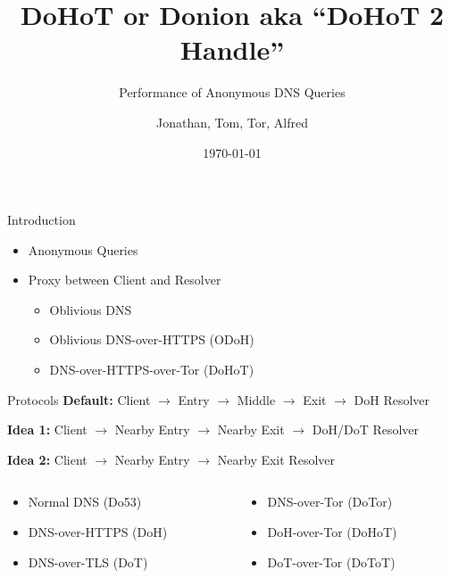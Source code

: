 \documentclass[xcolor=x11names,dvipsnames,aspectratio=169]{beamer}
\title{\huge DoHoT or Donion aka ``DoHoT 2 Handle''}
\subtitle{Performance of Anonymous DNS Queries}
\author{\small Jonathan, Tom, Tor, Alfred}
\date{\today}
\begin{document}
    \setcounter{showProgressBar}{0}
	\setcounter{showSlideNumbers}{0}

	\frame{\titlepage}

	\setcounter{framenumber}{0}
	\setcounter{showProgressBar}{1}
	\setcounter{showSlideNumbers}{1}

    \begin{frame}{Introduction}
        \begin{itemize}
            \item Anonymous Queries
            \item Proxy between Client and Resolver
            \begin{itemize}
                \item Oblivious DNS
                \item Oblivious DNS-over-HTTPS (ODoH)
                \item DNS-over-HTTPS-over-Tor (DoHoT)
            \end{itemize}
        \end{itemize}
    \end{frame}

    \begin{frame}{Protocols}
        \textbf{Default:}
        Client $\rightarrow$
        Entry $\rightarrow$
        Middle $\rightarrow$
        Exit $\rightarrow$
        DoH Resolver

        \vspace{1em}
        \textbf{Idea 1:}
        Client $\rightarrow$
        Nearby Entry $\rightarrow$
        Nearby Exit $\rightarrow$
        DoH/DoT Resolver

        \vspace{1em}
        \textbf{Idea 2:}
        Client $\rightarrow$
        Nearby Entry $\rightarrow$
        Nearby Exit Resolver

        \vspace{2em}

        \begin{columns}
            \begin{column}{.5\textwidth}
                \begin{itemize}
                    \item Normal DNS (Do53)
                    \item DNS-over-HTTPS (DoH)
                    \item DNS-over-TLS (DoT)
                \end{itemize}
            \end{column}
            \begin{column}{.5\textwidth}
                \begin{itemize}
                    \item DNS-over-Tor (DoTor)
                    \item DoH-over-Tor (DoHoT)
                    \item DoT-over-Tor (DoToT)
                \end{itemize}
            \end{column}
        \end{columns}
    \end{frame}
\end{document}
